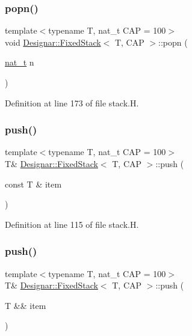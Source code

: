 \subsubsection{\texorpdfstring{popn()}{popn()}}
{\footnotesize\ttfamily template$<$typename T, nat\+\_\+t C\+AP = 100$>$ \\
void \hyperlink{class_designar_1_1_fixed_stack}{Designar\+::\+Fixed\+Stack}$<$ T, C\+AP $>$\+::popn (\begin{DoxyParamCaption}\item[{\hyperlink{namespace_designar_aa72662848b9f4815e7bf31a7cf3e33d1}{nat\+\_\+t}}]{n }\end{DoxyParamCaption})\hspace{0.3cm}{\ttfamily [inline]}}



Definition at line 173 of file stack.\+H.

\mbox{\label{class_designar_1_1_fixed_stack_a2c6786c06798604aaa851e0589c7ba75}} 
\subsubsection{\texorpdfstring{push()}{push()}\hspace{0.1cm}{\footnotesize\ttfamily [1/2]}}
{\footnotesize\ttfamily template$<$typename T, nat\+\_\+t C\+AP = 100$>$ \\
T\& \hyperlink{class_designar_1_1_fixed_stack}{Designar\+::\+Fixed\+Stack}$<$ T, C\+AP $>$\+::push (\begin{DoxyParamCaption}\item[{const T \&}]{item }\end{DoxyParamCaption})\hspace{0.3cm}{\ttfamily [inline]}}



Definition at line 115 of file stack.\+H.

\mbox{\label{class_designar_1_1_fixed_stack_ac41dfc3fd83bc3b0176e37dcfd600f70}} 
\subsubsection{\texorpdfstring{push()}{push()}\hspace{0.1cm}{\footnotesize\ttfamily [2/2]}}
{\footnotesize\ttfamily template$<$typename T, nat\+\_\+t C\+AP = 100$>$ \\
T\& \hyperlink{class_designar_1_1_fixed_stack}{Designar\+::\+Fixed\+Stack}$<$ T, C\+AP $>$\+::push (\begin{DoxyParamCaption}\item[{T \&\&}]{item }\end{DoxyParamCaption})\hspace{0.3cm}{\ttfamily [inline]}}



